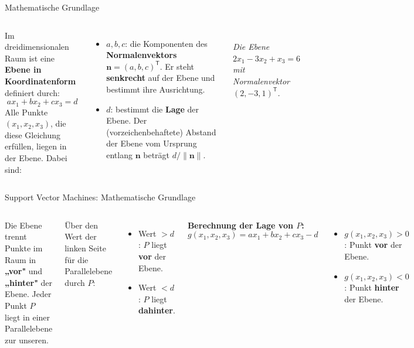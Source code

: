 \begin{frame}{Mathematische Grundlage}
    \footnotesize
\begin{columns}

Im dreidimensionalen Raum ist eine \textbf{Ebene in Koordinatenform}
definiert durch:
\[
  a x_1 + b x_2 + c x_3 = d
\]
Alle Punkte $(x_1, x_2, x_3)$, die diese Gleichung erfüllen, liegen in der
Ebene. Dabei sind:

\vspace{0.3em}
\begin{itemize}
  \item $a, b, c$: die Komponenten des \textbf{Normalenvektors}
        $\mathbf{n} = (a, b, c)^{\mathsf{T}}$. Er steht \textbf{senkrecht} auf der
        Ebene und bestimmt ihre Ausrichtung.
  \item $d$: bestimmt die \textbf{Lage} der Ebene. Der (vorzeichenbehaftete)
        Abstand der Ebene vom Ursprung entlang $\mathbf{n}$ beträgt
        $d / \lVert\mathbf{n}\rVert$.
\end{itemize}

\centering
\\[4pt]
{\footnotesize\itshape Die Ebene $2x_1 - 3x_2 + x_3 = 6$ mit Normalenvektor
$(2, -3, 1)^{\mathsf{T}}$.}
\end{columns}
\end{frame}


\begin{frame}{Support Vector Machines: Mathematische Grundlage}
\begin{columns}
\centering


\footnotesize
Die Ebene trennt Punkte im Raum in \textbf{„vor"} und \textbf{„hinter"} der
Ebene. Jeder Punkt $P$ liegt in einer Parallelebene zur unseren.

\vspace{0.3em}
Über den Wert der linken Seite für die Parallelebene durch $P$\;:
\begin{itemize}
  \item Wert $> d$: $P$ liegt \textbf{vor} der Ebene.
  \item Wert $< d$: $P$ liegt \textbf{dahinter}.
\end{itemize}

\vspace{0.3em}
\textbf{Berechnung der Lage von $P$\;:}
\[
  g(x_1, x_2, x_3) = a x_1 + b x_2 + c x_3 - d
\]
\begin{itemize}
  \item $g(x_1, x_2, x_3) > 0$: Punkt \textbf{vor} der Ebene.
  \item $g(x_1, x_2, x_3) < 0$: Punkt \textbf{hinter} der Ebene.
\end{itemize}
\end{columns}
\end{frame}

